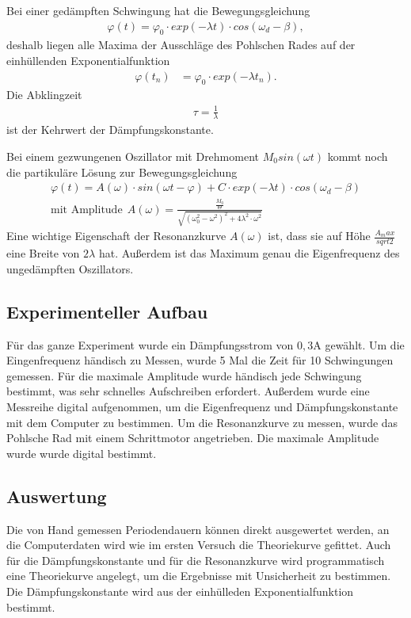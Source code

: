 \documentclass[11pt, a4paper]{article}
\begin{document}
    Bei einer gedämpften Schwingung hat die Bewegungsgleichung
    \begin{align}
        \varphi(t) = \varphi_0 \cdot exp(-\lambda t) \cdot cos(\omega_d - \beta), \label{theo}
    \end{align}
    deshalb liegen alle Maxima der Ausschläge des Pohlschen Rades auf der einhüllenden Exponentialfunktion
    \begin{align}
        \varphi(t_n) &= \varphi_0 \cdot exp(-\lambda t_n).
    \end{align}
    Die Abklingzeit
    \begin{align}
        \tau = \frac{1}{\lambda}
    \end{align}
    ist der Kehrwert der Dämpfungskonstante.

    Bei einem gezwungenen Oszillator mit Drehmoment $M_0 sin(\omega t)$ kommt noch die partikuläre Lösung zur Bewegungsgleichung
    \begin{align}
        \varphi(t) = A(\omega) \cdot sin(\omega t - \varphi) + C \cdot exp(-\lambda t) \cdot cos(\omega_d - \beta) \\
        \text{mit Amplitude}  \ \ A(\omega) = \frac{\frac{M_0}{\Theta}}{\sqrt{\left( \omega_0^2 - \omega^2 \right)^2 + 4 \lambda^2 \cdot \omega^2}} \label{aomega}
    \end{align}
    Eine wichtige Eigenschaft der Resonanzkurve $A(\omega)$ ist, dass sie auf Höhe $\frac{A_max}{sqrt{2}}$ eine Breite von $2\lambda$ hat.
    Außerdem ist das Maximum genau die Eigenfrequenz des ungedämpften Oszillators.

    \subsection{Experimenteller Aufbau}
    Für das ganze Experiment wurde ein Dämpfungsstrom von $0,3 \si{\ampere}$ gewählt.
    Um die Eingenfrequenz händisch zu Messen, wurde 5 Mal die Zeit für 10 Schwingungen gemessen.
    Für die maximale Amplitude wurde händisch jede Schwingung bestimmt, was sehr schnelles Aufschreiben erfordert.
    Außerdem wurde eine Messreihe digital aufgenommen, um die Eigenfrequenz und Dämpfungskonstante mit dem Computer zu bestimmen.
    Um die Resonanzkurve zu  messen, wurde das Pohlsche Rad mit einem Schrittmotor angetrieben. Die maximale Amplitude wurde
    wurde digital bestimmt.

    \subsection{Auswertung}
    Die von Hand gemessen Periodendauern können direkt ausgewertet werden, an die Computerdaten
    wird wie im ersten Versuch die Theoriekurve gefittet. Auch für die Dämpfungskonstante und für die
    Resonanzkurve wird programmatisch eine Theoriekurve angelegt, um die Ergebnisse mit Unsicherheit
    zu bestimmen. Die Dämpfungskonstante wird aus der einhülleden Exponentialfunktion bestimmt.
\end{document}
